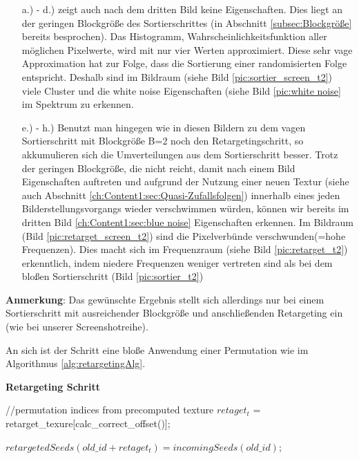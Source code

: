 \begin{itemize}
    \item[a.) - d.)] zeigt auch nach dem dritten Bild keine  Eigenschaften.
                     Dies liegt an der geringen Blockgröße des Sortierschrittes 
                     (in Abschnitt \ref{subsec:Blockgröße} bereits besprochen). Das Histogramm, Wahrscheinlichkeitsfunktion
                     aller möglichen Pixelwerte, wird mit nur vier Werten approximiert. Diese sehr vage Approximation 
                     hat zur Folge, dass die Sortierung einer randomisierten Folge entspricht. Deshalb sind im Bildraum
                     (siehe Bild \ref{pic:sortier_screen_t2}) viele Cluster und die white noise Eigenschaften 
                     (siehe Bild \ref{pic:white noise} im Spektrum zu erkennen.
                     \par 
                    
    \item[e.) - h.)] Benutzt man hingegen wie in diesen Bildern zu dem vagen Sortierschritt mit Blockgröße B=2 noch den Retargetingschritt, so akkumulieren sich die 
                    Umverteilungen aus dem Sortierschritt besser. Trotz der geringen Blockgröße, die nicht reicht, damit nach einem 
                    Bild  Eigenschaften auftreten und aufgrund der Nutzung einer neuen 
                    Textur (siehe auch Abschnitt \ref{ch:Content1:sec:Quasi-Zufallsfolgen}) innerhalb eines jeden 
                    Bilderstellungsvorgangs wieder verschwimmen würden, können wir bereits im dritten Bild 
                    \ref{ch:Content1:sec:blue noise} Eigenschaften erkennen. Im Bildraum (Bild \ref{pic:retarget_screen_t2})
                    sind die Pixelverbünde verschwunden(=hohe Frequenzen). Dies macht sich im Frequenzraum 
                    (siehe Bild \ref{pic:retarget_t2}) erkenntlich, indem niedere Frequenzen weniger vertreten sind 
                    als bei dem bloßen Sortierschritt (Bild \ref{pic:sortier_t2})
\end{itemize}

\textbf{Anmerkung}: Das gewünschte Ergebnis stellt sich allerdings nur bei einem Sortierschritt mit ausreichender Blockgröße und 
anschließenden Retargeting ein (wie bei unserer Screenshotreihe).

An sich ist der Schritt eine bloße Anwendung einer Permutation wie im Algorithmus \ref{alg:retargetingAlg}.

\begin{tcolorbox}
\begin{algorithm}[H]
    \caption{\textbf{Retargeting Schritt}}
    \begin{algorithmic}[1]
        \State //permutation indices from precomputed texture
        \State $retaget_{t}$ = retarget\_texure[calc\_correct\_offset()];
        
        \State $retargetedSeeds(old\_id + retaget_{t}) = incomingSeeds(old\_id);$
        
    \end{algorithmic}
    \label{alg:retargetingAlg}
\end{algorithm}
\end{tcolorbox}

